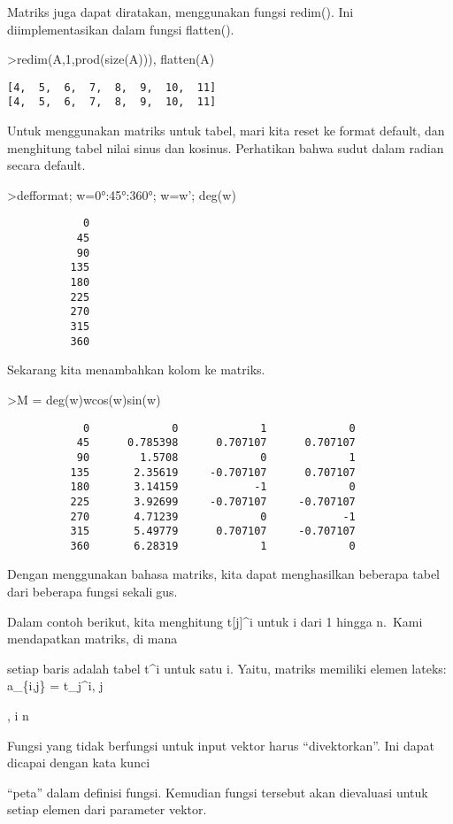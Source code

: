 \documentclass[
]{book}
\begin{document}
Matriks juga dapat diratakan, menggunakan fungsi redim(). Ini diimplementasikan dalam fungsi flatten().

\textgreater redim(A,1,prod(size(A))), flatten(A)

\begin{verbatim}
[4,  5,  6,  7,  8,  9,  10,  11]
[4,  5,  6,  7,  8,  9,  10,  11]
\end{verbatim}

Untuk menggunakan matriks untuk tabel, mari kita reset ke format default, dan menghitung tabel nilai sinus dan kosinus. Perhatikan bahwa sudut dalam radian secara default.

\textgreater defformat; w=0°:45°:360°; w=w'; deg(w)

\begin{verbatim}
            0 
           45 
           90 
          135 
          180 
          225 
          270 
          315 
          360 
\end{verbatim}

Sekarang kita menambahkan kolom ke matriks.

\textgreater M = deg(w)\textbar w\textbar cos(w)\textbar sin(w)

\begin{verbatim}
            0             0             1             0 
           45      0.785398      0.707107      0.707107 
           90        1.5708             0             1 
          135       2.35619     -0.707107      0.707107 
          180       3.14159            -1             0 
          225       3.92699     -0.707107     -0.707107 
          270       4.71239             0            -1 
          315       5.49779      0.707107     -0.707107 
          360       6.28319             1             0 
\end{verbatim}

Dengan menggunakan bahasa matriks, kita dapat menghasilkan beberapa tabel dari beberapa fungsi sekaligus.

Dalam contoh berikut, kita menghitung t{[}j{]}\^{}i untuk i dari 1 hingga n.~Kami mendapatkan matriks, di mana

setiap baris adalah tabel t\^{}i untuk satu i. Yaitu, matriks memiliki elemen lateks: a\_\{i,j\} = t\_j\^{}i,  \le j

,  \le i \le n

Fungsi yang tidak berfungsi untuk input vektor harus ``divektorkan''. Ini dapat dicapai dengan kata kunci

``peta'' dalam definisi fungsi. Kemudian fungsi tersebut akan dievaluasi untuk setiap elemen dari parameter vektor.
\end{document}
